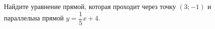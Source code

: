 \begin{ex}
	\begin{condition}
		Найдите уравнение прямой, которая проходит через точку \( (3;-1) \) и параллельна прямой \( y=\dfrac{1}{5}x+4 \).
	\end{condition}
\end{ex}
